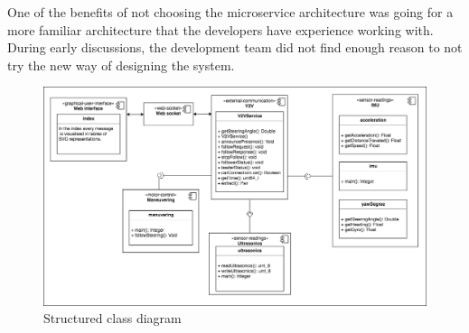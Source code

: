 \documentclass[12pt]{article}
\begin{document}
One of the benefits of not choosing the microservice architecture was going for a more familiar architecture that the developers have experience working with. During early discussions, the development team did not find enough reason to not try the new way of designing the system.

\FloatBarrier %
\begin{figure}[ht!]
\centering
\includegraphics[width=\linewidth]{Diagrams/StructuredClassDiagram.png}
\caption{Structured class diagram}
\label{fig:Structured_class_diagram}
\end{figure}
\FloatBarrier %
\end{document}
